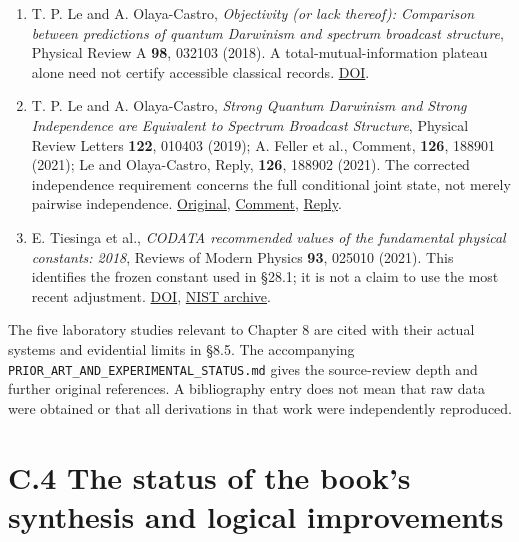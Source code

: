 \documentclass[
  11pt,
  oneside]{book}
\begin{document}
\begin{enumerate}
  W. H. Zurek, \emph{Quantum Darwinism}, Nature Physics \textbf{5},
  181--188 (2009). The established environmental-redundancy framework
  used in the discussion of records.
  \href{https://doi.org/10.1038/nphys1202}{DOI}.
\item
  T. P. Le and A. Olaya-Castro, \emph{Objectivity (or lack thereof):
  Comparison between predictions of quantum Darwinism and spectrum
  broadcast structure}, Physical Review A \textbf{98}, 032103 (2018). A
  total-mutual-information plateau alone need not certify accessible
  classical records.
  \href{https://doi.org/10.1103/PhysRevA.98.032103}{DOI}.
\item
  T. P. Le and A. Olaya-Castro, \emph{Strong Quantum Darwinism and
  Strong Independence are Equivalent to Spectrum Broadcast Structure},
  Physical Review Letters \textbf{122}, 010403 (2019); A. Feller et al.,
  Comment, \textbf{126}, 188901 (2021); Le and Olaya-Castro, Reply,
  \textbf{126}, 188902 (2021). The corrected independence requirement
  concerns the full conditional joint state, not merely pairwise
  independence.
  \href{https://doi.org/10.1103/PhysRevLett.122.010403}{Original},
  \href{https://doi.org/10.1103/PhysRevLett.126.188901}{Comment},
  \href{https://doi.org/10.1103/PhysRevLett.126.188902}{Reply}.
\item
  E. Tiesinga et al., \emph{CODATA recommended values of the fundamental
  physical constants: 2018}, Reviews of Modern Physics \textbf{93},
  025010 (2021). This identifies the frozen constant used in §28.1; it
  is not a claim to use the most recent adjustment.
  \href{https://doi.org/10.1103/RevModPhys.93.025010}{DOI},
  \href{https://physics.nist.gov/cuu/Constants/archive2018.html}{NIST
  archive}.
\end{enumerate}

The five laboratory studies relevant to Chapter 8 are cited with their
actual systems and evidential limits in §8.5. The accompanying
\texttt{PRIOR\_\allowbreak ART\_\allowbreak AND\_\allowbreak EXPERIMENTAL\_\allowbreak STATUS.\allowbreak md} gives the
source-review depth and further original references. A bibliography
entry does not mean that raw data were obtained or that all derivations
in that work were independently reproduced.

\section{C.4 The status of the book's synthesis and logical
improvements}
\end{document}
